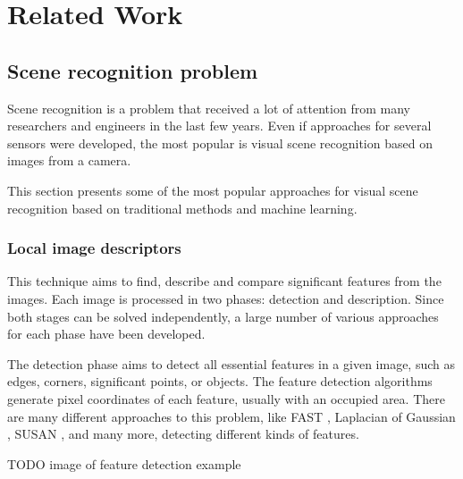 \chapter{Related Work}\label{chapter:relatedWork}

\section{Scene recognition problem}\label{section:sceneRecognitionProblem}

Scene recognition is a problem that received a lot of attention from many researchers and engineers in the last few years. Even if approaches for several sensors were developed, the most popular is visual scene recognition based on images from a camera.\par
This section presents some of the most popular approaches for visual scene recognition based on traditional methods and machine learning.

\subsection{Local image descriptors}\label{section:localImageDescriptors}

This technique aims to find, describe and compare significant features from the images. Each image is processed in two phases: detection and description. Since both stages can be solved independently, a large number of various approaches for each phase have been developed.\par
The detection phase aims to detect all essential features in a given image, such as edges, corners, significant points, or objects. The feature detection algorithms generate pixel coordinates of each feature, usually with an occupied area. There are many different approaches to this problem, like FAST \parencite{FAST}, Laplacian of Gaussian \parencite{LaplacianOfGaussian}, SUSAN \parencite{SUSAN}, and many more, detecting different kinds of features.\par

TODO image of feature detection example

